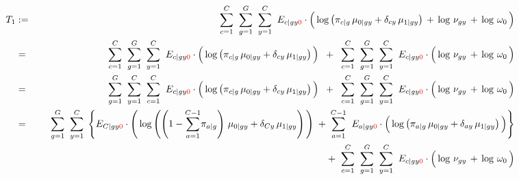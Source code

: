 \begin{eqnarray*}
T_{1}
&:=&
	\overset{C}{\underset{c=1}{\sum}}\;\;
	\overset{G}{\underset{g=1}{\sum}}\;\;
	\overset{C}{\underset{y=1}{\sum}}\;\;
	E_{c \vert gy{\color{red}0}}
	\cdot
	\left(\,
		\log\left(\pi_{c \vert g}\,\mu_{0 \vert gy} + \delta_{cy}\,\mu_{1\vert gy}\right)
		\,\overset{{\color{white}.}}{+}\,
		\log\,\nu_{gy}
		\,\overset{{\color{white}.}}{+}\,
		\log\,\omega_{0}
	\,\right)
\\
&=&
	\overset{C}{\underset{c=1}{\sum}}\;\;
	\overset{G}{\underset{g=1}{\sum}}\;\;
	\overset{C}{\underset{y=1}{\sum}}\;\;
	E_{c \vert gy{\color{red}0}}
	\cdot
	\left(\,
		\overset{{\color{white}.}}{\log}\left(\pi_{c \vert g}\,\mu_{0 \vert gy} + \delta_{cy}\,\mu_{1\vert gy}\right)
	\,\right)
	\;\; + \;\;
	\overset{C}{\underset{c=1}{\sum}}\;\;
	\overset{G}{\underset{g=1}{\sum}}\;\;
	\overset{C}{\underset{y=1}{\sum}}\;\;
	E_{c \vert gy{\color{red}0}}
	\cdot
	\left(\,
		\log\,\nu_{gy}
		\,\overset{{\color{white}.}}{+}\,
		\log\,\omega_{0}
	\,\right)	
\\
&=&
	\overset{G}{\underset{g=1}{\sum}}\;\;
	\overset{C}{\underset{y=1}{\sum}}\;\;
	\overset{C}{\underset{c=1}{\sum}}\;\;
	E_{c \vert gy{\color{red}0}}
	\cdot
	\left(\,
		\overset{{\color{white}.}}{\log}\left(\pi_{c \vert g}\,\mu_{0 \vert gy} + \delta_{cy}\,\mu_{1\vert gy}\right)
	\,\right)
	\;\; + \;\;
	\overset{C}{\underset{c=1}{\sum}}\;\;
	\overset{G}{\underset{g=1}{\sum}}\;\;
	\overset{C}{\underset{y=1}{\sum}}\;\;
	E_{c \vert gy{\color{red}0}}
	\cdot
	\left(\,
		\log\,\nu_{gy}
		\,\overset{{\color{white}.}}{+}\,
		\log\,\omega_{0}
	\,\right)	
\\
&=&
	{\color{white}+} \;\;
	\overset{G}{\underset{g=1}{\sum}}\;\;
	\overset{C}{\underset{y=1}{\sum}}\;
	\left\{
	E_{C \vert gy{\color{red}0}}
	\cdot
	\left(\,
		\overset{{\color{white}.}}{\log}\left(
			\left(1-\overset{C-1}{\underset{a=1}{\sum}}\pi_{a \vert g}\right)\,\mu_{0 \vert gy}
			+
			\delta_{Cy}\,\mu_{1\vert gy}
			\right)
	\,\right)
	\;+\;
	\overset{C-1}{\underset{a=1}{\sum}}\;\;
	E_{a \vert gy{\color{red}0}}
	\cdot
	\left(\,
		\overset{{\color{white}.}}{\log}\left(\pi_{a \vert g}\,\mu_{0 \vert gy}
		+
		\delta_{ay}\,\mu_{1\vert gy}\right)
	\,\right)
	\right\}
\\
&&
	+ \;\;
	\overset{C}{\underset{c=1}{\sum}}\;\;
	\overset{G}{\underset{g=1}{\sum}}\;\;
	\overset{C}{\underset{y=1}{\sum}}\;\;
	E_{c \vert gy{\color{red}0}}
	\cdot
	\left(\,
		\log\,\nu_{gy}
		\,\overset{{\color{white}.}}{+}\,
		\log\,\omega_{0}
	\,\right)	
\end{eqnarray*}

